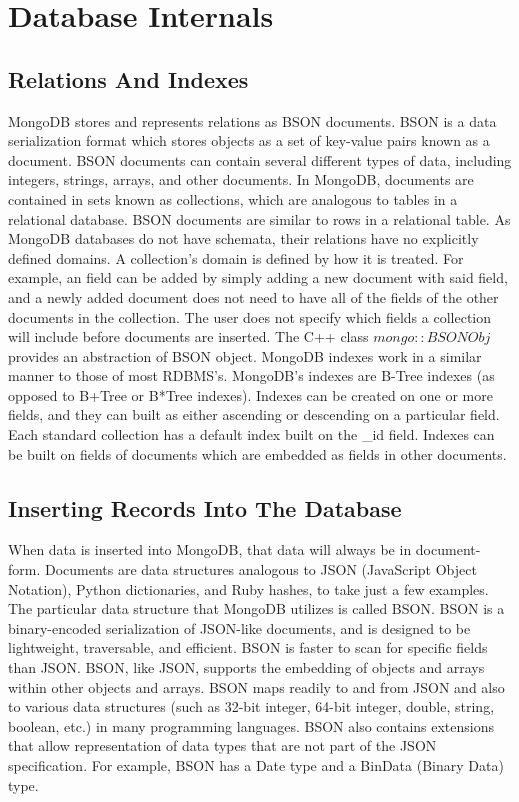 \documentclass{dependencies/acm_proc_article-sp}
\begin{document}
\section{Database Internals}
\subsection{Relations And Indexes}
MongoDB stores and represents relations as BSON documents\cite{1}.
BSON is a data serialization format which stores objects as a set of key-value pairs known as a document.
BSON documents can contain several different types of data, including integers, strings, arrays, and other documents\cite{2}.
In MongoDB, documents are contained in sets known as collections, which are analogous to tables in a relational database\cite{3}.
BSON documents are similar to rows in a relational table.
As MongoDB databases do not have schemata, their relations have no explicitly defined domains.
A collection's domain is defined by how it is treated.
For example, an field can be added by simply adding a new document with said field, and a newly added document does not need to have all of the fields of the other documents in the collection.
The user does not specify which fields a collection will include before documents are inserted\cite{4}.
The C++ class $mongo::BSONObj$ provides an abstraction of BSON object\cite{5}.
MongoDB indexes work in a similar manner to those of most RDBMS's.
MongoDB's indexes are B-Tree indexes (as opposed to B+Tree or B*Tree indexes).
Indexes can be created on one or more fields, and they can built as either ascending or descending on a particular field.
Each standard collection has a default index built on the \_id field.  Indexes can be built on fields of documents which are embedded as fields in other documents\cite{6}.
\subsection{Inserting Records Into The Database}
When data is inserted into MongoDB, that data will always be in document-form.
Documents are data structures analogous to JSON (JavaScript Object Notation), Python dictionaries, and Ruby hashes, to take just a few examples.
The particular data structure that MongoDB utilizes is called BSON.
BSON is a binary-encoded serialization of JSON-like documents, and is designed to be lightweight, traversable, and efficient.
BSON is faster to scan for specific fields than JSON.
BSON, like JSON, supports the embedding of objects and arrays within other objects and arrays.
BSON maps readily to and from JSON and also to various data structures (such as 32-bit integer, 64-bit integer, double, string, boolean, etc.) in many programming languages.
BSON also contains extensions that allow representation of data types that are not part of the JSON specification.
For example, BSON has a Date type and a BinData (Binary Data) type.
\end{document}
